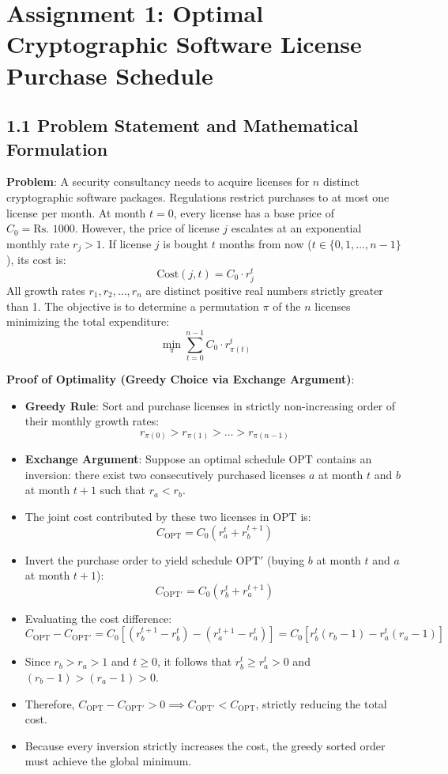 \documentclass[12pt]{article}
\begin{document}
\section*{Assignment 1: Optimal Cryptographic Software License Purchase Schedule}

\subsection*{1.1 Problem Statement and Mathematical Formulation}
\textbf{Problem}: A security consultancy needs to acquire licenses for $n$ distinct cryptographic software packages. Regulations restrict purchases to at most one license per month. At month $t = 0$, every license has a base price of $C_0 = \text{Rs. } 1000$. However, the price of license $j$ escalates at an exponential monthly rate $r_j > 1$. If license $j$ is bought $t$ months from now ($t \in \{0, 1, \dots, n-1\}$), its cost is:
\[
\text{Cost}(j, t) = C_0 \cdot r_j^t
\]
All growth rates $r_1, r_2, \dots, r_n$ are distinct positive real numbers strictly greater than 1. The objective is to determine a permutation $\pi$ of the $n$ licenses minimizing the total expenditure:
\[
\min_{\pi} \sum_{t=0}^{n-1} C_0 \cdot r_{\pi(t)}^t
\]

\textbf{Proof of Optimality (Greedy Choice via Exchange Argument)}:
\begin{itemize}
    \item \textbf{Greedy Rule}: Sort and purchase licenses in strictly non-increasing order of their monthly growth rates:
    \[
    r_{\pi(0)} > r_{\pi(1)} > \dots > r_{\pi(n-1)}
    \]
    \item \textbf{Exchange Argument}: Suppose an optimal schedule $\text{OPT}$ contains an inversion: there exist two consecutively purchased licenses $a$ at month $t$ and $b$ at month $t+1$ such that $r_a < r_b$.
    \item The joint cost contributed by these two licenses in $\text{OPT}$ is:
    \[
    C_{\text{OPT}} = C_0 \left( r_a^t + r_b^{t+1} \right)
    \]
    \item Invert the purchase order to yield schedule $\text{OPT}'$ (buying $b$ at month $t$ and $a$ at month $t+1$):
    \[
    C_{\text{OPT}'} = C_0 \left( r_b^t + r_a^{t+1} \right)
    \]
    \item Evaluating the cost difference:
    \[
    C_{\text{OPT}} - C_{\text{OPT}'} = C_0 \left[ (r_b^{t+1} - r_b^t) - (r_a^{t+1} - r_a^t) \right] = C_0 \left[ r_b^t(r_b - 1) - r_a^t(r_a - 1) \right]
    \]
    \item Since $r_b > r_a > 1$ and $t \ge 0$, it follows that $r_b^t \ge r_a^t > 0$ and $(r_b - 1) > (r_a - 1) > 0$.
    \item Therefore, $C_{\text{OPT}} - C_{\text{OPT}'} > 0 \implies C_{\text{OPT}'} < C_{\text{OPT}}$, strictly reducing the total cost.
    \item Because every inversion strictly increases the cost, the greedy sorted order must achieve the global minimum.
\end{itemize}
\end{document}
